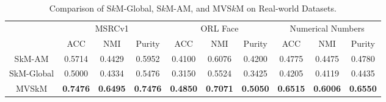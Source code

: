 \documentclass[journal]{IEEEtran}
\begin{document}
\begin{table}[]
	\centering
	\caption{Comparison of S$k$M-Global, S$k$M-AM, and MVS$k$M on Real-world Datasets.}
	\label{tab:exps}
	\begin{tabular}{@{}cccccccccc@{}}
		\toprule
		& \multicolumn{3}{c}{MSRCv1}                                                                                         & \multicolumn{3}{c}{ORL Face}                                                                                       & \multicolumn{3}{c}{Numerical Numbers}                                                         \\ \cmidrule(l){2-10} 
		& \multicolumn{1}{c|}{ACC}             & \multicolumn{1}{c|}{NMI}             & \multicolumn{1}{c|}{Purity}          & \multicolumn{1}{c|}{ACC}             & \multicolumn{1}{c|}{NMI}             & \multicolumn{1}{c|}{Purity}          & \multicolumn{1}{c|}{ACC}             & \multicolumn{1}{c|}{NMI}             & Purity          \\ \midrule
		\multicolumn{1}{c|}{SkM-AM}     & \multicolumn{1}{c|}{0.5714}          & \multicolumn{1}{c|}{0.4429}          & \multicolumn{1}{c|}{0.5952}          & \multicolumn{1}{c|}{0.4100}          & \multicolumn{1}{c|}{0.6076}          & \multicolumn{1}{c|}{0.4200}          & \multicolumn{1}{c|}{0.4775}          & \multicolumn{1}{c|}{0.4475}          & 0.4780          \\
		\multicolumn{1}{c|}{SkM-Global} & \multicolumn{1}{c|}{0.5000}          & \multicolumn{1}{c|}{0.4334}          & \multicolumn{1}{c|}{0.5476}          & \multicolumn{1}{c|}{0.3150}          & \multicolumn{1}{c|}{0.5524}          & \multicolumn{1}{c|}{0.3425}          & \multicolumn{1}{c|}{0.4205}          & \multicolumn{1}{c|}{0.4119}          & 0.4435          \\
		\multicolumn{1}{c|}{MVSkM}      & \multicolumn{1}{c|}{\textbf{0.7476}} & \multicolumn{1}{c|}{\textbf{0.6495}} & \multicolumn{1}{c|}{\textbf{0.7476}} & \multicolumn{1}{c|}{\textbf{0.4850}} & \multicolumn{1}{c|}{\textbf{0.7071}} & \multicolumn{1}{c|}{\textbf{0.5050}} & \multicolumn{1}{c|}{\textbf{0.6515}} & \multicolumn{1}{c|}{\textbf{0.6006}} & \textbf{0.6550} \\ \bottomrule
	\end{tabular}
\end{table}

\end{document}
